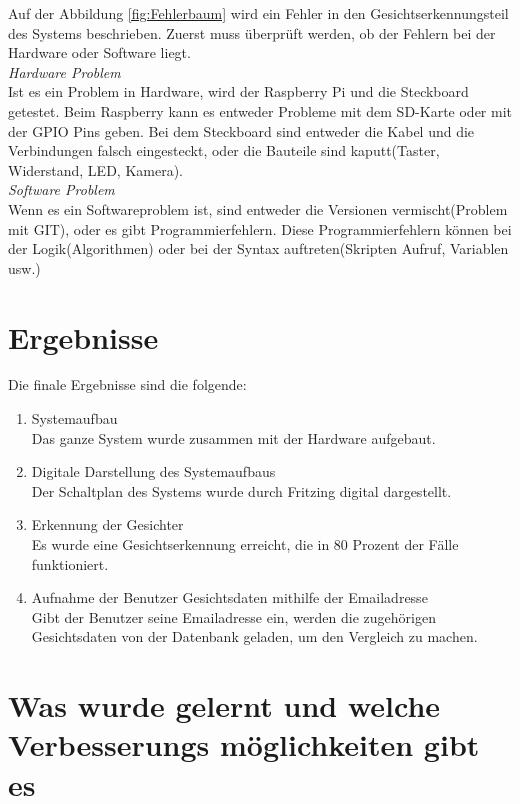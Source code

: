 	Auf der Abbildung \ref{fig:Fehlerbaum} wird ein Fehler in den Gesichtserkennungsteil des Systems beschrieben. Zuerst muss überprüft werden, ob der Fehlern bei der Hardware oder Software liegt.\\
	
	\textit{Hardware Problem}\\
	Ist es ein Problem in Hardware, wird der Raspberry Pi und die Steckboard getestet. Beim Raspberry kann es entweder Probleme mit dem SD-Karte oder mit der GPIO Pins geben. Bei dem Steckboard sind entweder die Kabel und die Verbindungen falsch eingesteckt, oder die Bauteile sind kaputt(Taster, Widerstand, LED, Kamera).\\
	
	\textit{Software Problem}\\
	Wenn es ein Softwareproblem ist, sind entweder die Versionen vermischt(Problem mit GIT), oder es gibt Programmierfehlern. Diese Programmierfehlern können bei der Logik(Algorithmen) oder bei der Syntax auftreten(Skripten Aufruf, Variablen usw.)
	
	\section{Ergebnisse}
	Die finale Ergebnisse sind die folgende:\\
	\begin{enumerate}
		\item Systemaufbau \\
		Das ganze System wurde zusammen mit der Hardware aufgebaut.
		\item Digitale Darstellung des Systemaufbaus\\
		Der Schaltplan des Systems wurde durch Fritzing digital dargestellt.
		\item Erkennung der Gesichter \\
		Es wurde eine Gesichtserkennung erreicht, die in 80 Prozent der Fälle funktioniert.
		\item Aufnahme der Benutzer Gesichtsdaten mithilfe der Emailadresse\\
		Gibt der Benutzer seine Emailadresse ein, werden die zugehörigen Gesichtsdaten von der Datenbank geladen, um den Vergleich zu machen.
	\end{enumerate}

\section{Was wurde gelernt und 
\textbf{welche
	 Verbesserungs
	 möglichkeiten gibt es}}

